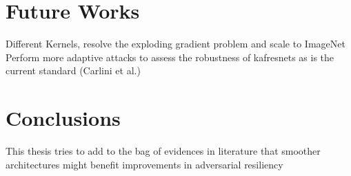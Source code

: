 \documentclass[LaM,binding=0.6cm]{./packages/sapthesis/sapthesis}
\begin{document}
\chapter{Future Works}

    Different Kernels, resolve the exploding gradient problem and scale to ImageNet
    Perform more adaptive attacks to assess the robustness of kafresnets as is the current standard (Carlini et al.)


\chapter{Conclusions}

    This thesis tries to add to the bag of evidences in literature that smoother architectures might benefit improvements in adversarial resiliency
    
    
\appendix


\backmatter
\end{document}
